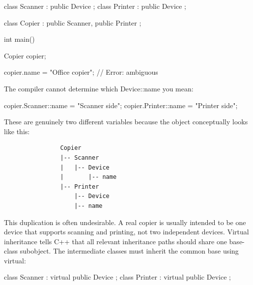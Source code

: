\documentclass{report}
\begin{document}
\begin{itemize}
\begin{cppcode}
            class Scanner : public Device {};
            class Printer : public Device {};

            class Copier : public Scanner, public Printer {};

            int main() {
                Copier copier;

                copier.name = "Office copier"; // Error: ambiguous
            }
            \end{cppcode}
            \bigbreak \noindent 
            The compiler cannot determine which Device::name you mean:
            \bigbreak \noindent 
            \begin{cppcode}
                copier.Scanner::name = "Scanner side";
                copier.Printer::name = "Printer side";
            \end{cppcode}
            \bigbreak \noindent 
            These are genuinely two different variables because the object conceptually looks like this:
            \bigbreak \noindent 
            \begin{verbatim}
                Copier
                |-- Scanner
                |   |-- Device
                |       |-- name
                |-- Printer
                    |-- Device
                    |-- name
            \end{verbatim}
            \bigbreak \noindent 
            This duplication is often undesirable. A real copier is usually intended to be one device that supports scanning and printing, not two independent devices.
            \bigbreak \noindent 
            Virtual inheritance tells C++ that all relevant inheritance paths should share one base-class subobject.
            \bigbreak \noindent 
            The intermediate classes must inherit the common base using virtual:
            \bigbreak \noindent 
            \begin{cppcode}
                class Scanner : virtual public Device {};
                class Printer : virtual public Device {};


\end{cppcode}
\end{itemize}
\end{document}
